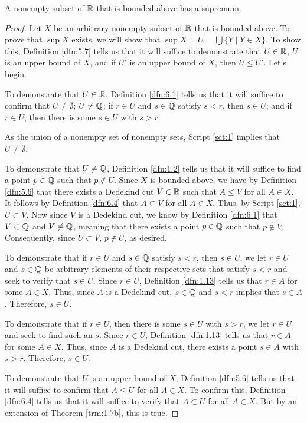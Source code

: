 \documentclass[../main.tex]{subfiles}
\begin{document}
\begin{lemma}\label{lem:6.6}
    A nonempty subset of $\mathbb{R}$ that is bounded above has a supremum.
    \begin{proof}
        Let $X$ be an arbitrary nonempty subset of $\mathbb{R}$ that is bounded above. To prove that $\sup X$ exists, we will show that $\sup X=U=\bigcup\{Y\mid Y\in X\}$. To show this, Definition \ref{dfn:5.7} tells us that it will suffice to demonstrate that $U\in\mathbb{R}$, $U$ is an upper bound of $X$, and if $U'$ is an upper bound of $X$, then $U\leq U'$. Let's begin.\par\smallskip
        To demonstrate that $U\in\mathbb{R}$, Definition \ref{dfn:6.1} tells us that it will suffice to confirm that $U\neq\emptyset$; $U\neq\mathbb{Q}$; if $r\in U$ and $s\in\mathbb{Q}$ satisfy $s<r$, then $s\in U$; and if $r\in U$, then there is some $s\in U$ with $s>r$.\par
        As the union of a nonempty set of nonempty sets, Script \ref{sct:1} implies that $U\neq\emptyset$.\par
        To demonstrate that $U\neq\mathbb{Q}$, Definition \ref{dfn:1.2} tells us that it will suffice to find a point $p\in\mathbb{Q}$ such that $p\notin U$. Since $X$ is bounded above, we have by Definition \ref{dfn:5.6} that there exists a Dedekind cut $V\in\mathbb{R}$ such that $A\leq V$ for all $A\in X$. It follows by Definition \ref{dfn:6.4} that $A\subset V$ for all $A\in X$. Thus, by Script \ref{sct:1}, $U\subset V$. Now since $V$ is a Dedekind cut, we know by Definition \ref{dfn:6.1} that $V\subset\mathbb{Q}$ and $V\neq\mathbb{Q}$, meaning that there exists a point $p\in\mathbb{Q}$ such that $p\notin V$. Consequently, since $U\subset V$, $p\notin U$, as desired.\par
        To demonstrate that if $r\in U$ and $s\in\mathbb{Q}$ satisfy $s<r$, then $s\in U$, we let $r\in U$ and $s\in\mathbb{Q}$ be arbitrary elements of their respective sets that satisfy $s<r$ and seek to verify that $s\in U$. Since $r\in U$, Definition \ref{dfn:1.13} tells us that $r\in A$ for some $A\in X$. Thus, since $A$ is a Dedekind cut, $s\in\mathbb{Q}$ and $s<r$ implies that $s\in A$. Therefore, $s\in U$.\par
        To demonstrate that if $r\in U$, then there is some $s\in U$ with $s>r$, we let $r\in U$ and seek to find such an $s$. Since $r\in U$, Definition \ref{dfn:1.13} tells us that $r\in A$ for some $A\in X$. Thus, since $A$ is a Dedekind cut, there exists a point $s\in A$ with $s>r$. Therefore, $s\in U$.\par\smallskip
        To demonstrate that $U$ is an upper bound of $X$, Definition \ref{dfn:5.6} tells us that it will suffice to confirm that $A\leq U$ for all $A\in X$. To confirm this, Definition \ref{dfn:6.4} tells us that it will suffice to verify that $A\subset U$ for all $A\in X$. But by an extension of Theorem \ref{trm:1.7b}, this is true.\par\smallskip

\end{proof}
\end{lemma}
\end{document}
